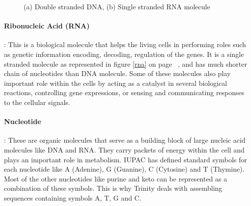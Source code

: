 \label{key}\documentclass[bachinf, english ,zihtitle,final,hyperref,utf8]{zihpub}
\begin{document}
\begin{figure}[h]
\center
{}
\hspace{50pt}
\caption{(a) Double stranded DNA, (b) Single stranded RNA molecule}
\end{figure}
\paragraph{Ribonucleic Acid (RNA)}: 
This is a biological molecule that helps the living cells in performing roles such as genetic information encoding, decoding, regulation of the genes. It is a single stranded molecule as represented in figure \ref{rna} on page ~\pageref{rna}, and has much shorter chain of nucleotides than DNA molecule. Some of these molecules also play important role within the cells by acting as a catalyst in several biological reactions, controlling gene expressions, or sensing and communicating responses to the cellular signals. 
\paragraph{Nucleotide}: These are organic molecules that serve as a building block of large nucleic acid molecules like DNA and RNA. They carry packets of energy within the cell and plays an important role in metabolism. IUPAC has defined standard symbols for each nucleotide like A (Adenine), G (Guanine), C (Cytosine) and T (Thymine). Most of the other nucleotides like purine and keto can be represented as a combination of these symbols. This is why Trinity deals with assembling sequences containing symbols A, T, G and C.
\end{document}
